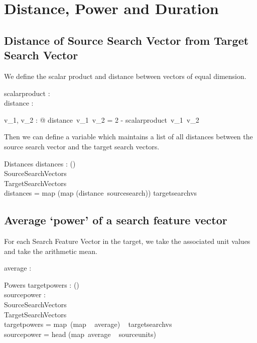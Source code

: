 \documentclass[11pt]{article}
\begin{document}
\section{Distance, Power and Duration}	
	
\subsection{Distance of Source Search Vector from Target Search Vector}

We define the scalar product and distance between vectors of equal dimension. 

\begin{axdef}
	scalarproduct : \V \fun \V \fun \R \\
	distance : \V \fun \V \fun \R \\
\end{axdef}

\begin{zed}
	\forall v_1, v_2 : \V @  distance~v_1~v_2 = 2 - scalarproduct~v_1~v_2		
\end{zed}

Then we can define a variable which maintains a list of all distances between the source search vector and the target search vectors. 

\begin{schema}{Distances}
	distances : \seq (\seq \R)  \\
	SourceSearchVectors \\
	TargetSearchVectors \\
\where
	distances = map (map (distance~sourcesearch)) targetsearchvs
\end{schema}

\subsection{Average `power' of a search feature vector} 

For each Search Feature Vector in the target, we take the associated unit values and take the arithmetic mean. 

\begin{axdef}
	average : \V \fun \R
\end{axdef}

\begin{schema}{Powers}
	targetpowers : \seq (\seq \R) \\
	sourcepower : \R \\
	SourceSearchVectors \\
	TargetSearchVectors \\
\where 
	targetpowers = map~(map ~ average) ~ targetsearchvs\\
	sourcepower = head (map~average ~ sourceunits)
\end{schema}
\end{document}
